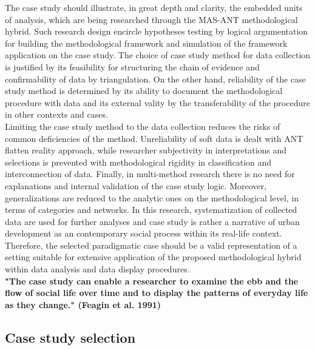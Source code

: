 \documentclass[11pt]{report}
\begin{document}
The case study should illustrate, in great depth and clarity, the embedded units of analysis, which are being researched through the MAS-ANT methodological hybrid. Such research design encircle hypotheses testing by logical argumentation for building the methodological framework and simulation of the framework application on the case study. The choice of case study method for data collection is justified by its feasibility for structuring the chain of evidence and confirmability of data by triangulation. On the other hand, reliability of the case study method is determined by its ability to document the methodological procedure with data and its external vality by the transferability of the procedure in other contexts and cases.
\\
Limiting the case study method to the data collection reduces the risks of common deficiencies of the method. Unreliability of soft data is dealt with ANT flatten reality approach, while researcher subjectivity in interpretations and selections is prevented with methodological rigidity in classification and interconnection of data. Finally, in multi-method research there is no need for explanations and internal validation of the case study logic. Moreover, generalizations are reduced to the analytic ones on the methodological level, in terms of categories and networks. In this research, systematization of collected data are used for further analyses and case study is rather a narrative of urban development as an contemporary social process within its real-life context. Therefore, the selected paradigmatic case should be a valid representation of a setting suitable for extensive application of the proposed methodological hybrid within data analysis and data display procedures.
\\
\textbf{"The case study can enable a researcher to examine the ebb and the flow of social life over time and to display the patterns of everyday life as they change." (Feagin et al. 1991)}

\subsection{Case study selection}
\end{document}
